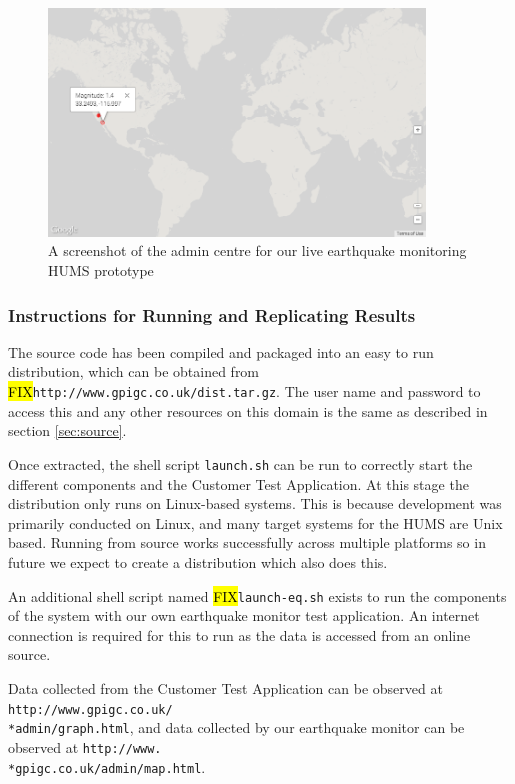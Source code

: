 \documentclass[10pt,a4paper]{article}
\begin{document}
\begin{figure}[h!]
  \centering
  \includegraphics[width=10cm]{images/plotearthquakes.png}
  \caption{A screenshot of the admin centre for our live earthquake monitoring HUMS prototype}
  \label{fig:plotearthquakes}
\end{figure}

\subsubsection{Instructions for Running and Replicating Results}
The source code has been compiled and packaged into an easy to run distribution, which can be obtained from \hl{FIX}\verb+http://www.gpigc.co.uk/dist.tar.gz+. The user name and password to access this and any other resources on this domain is the same as described in section \ref{sec:source}.

Once extracted, the shell script \verb+launch.sh+ can be run to correctly start the different components and the Customer Test Application. At this stage the distribution only runs on Linux-based systems. This is because development was primarily conducted on Linux, and many target systems for the HUMS are Unix based. Running from source works successfully across multiple platforms so in future we expect to create a distribution which also does this.

An additional shell script named \hl{FIX}\verb+launch-eq.sh+ exists to run the components of the system with our own earthquake monitor test application. An internet connection is required for this to run as the data is accessed from an online source.

Data collected from the Customer Test Application can be observed at \texttt{http://www.gpigc.co.uk/\\*admin/graph.html}, and data collected by our earthquake monitor can be observed at \texttt{http://www.\\*gpigc.co.uk/admin/map.html}.
\end{document}
